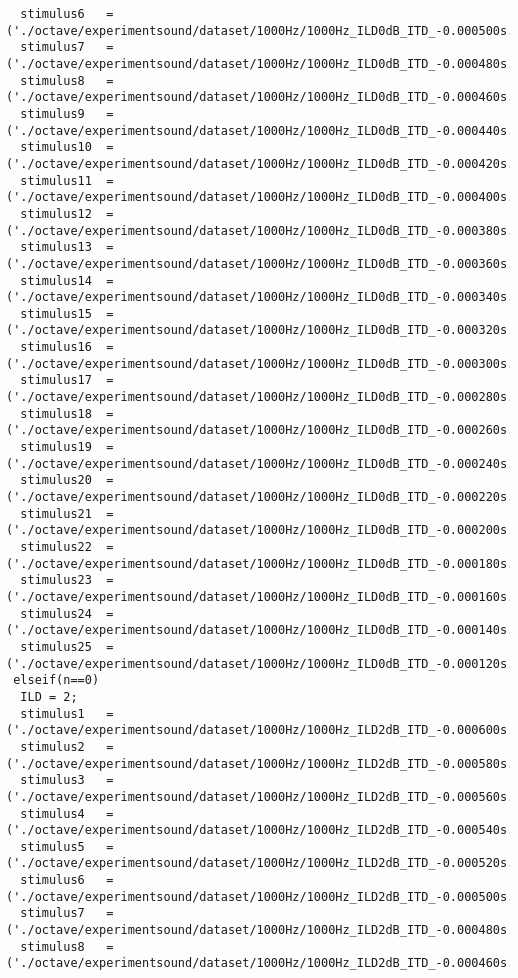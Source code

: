 {\begin{verbatim}
  stimulus6   =('./octave/experimentsound/dataset/1000Hz/1000Hz_ILD0dB_ITD_-0.000500s.wav');
  stimulus7   =('./octave/experimentsound/dataset/1000Hz/1000Hz_ILD0dB_ITD_-0.000480s.wav');
  stimulus8   =('./octave/experimentsound/dataset/1000Hz/1000Hz_ILD0dB_ITD_-0.000460s.wav');
  stimulus9   =('./octave/experimentsound/dataset/1000Hz/1000Hz_ILD0dB_ITD_-0.000440s.wav');
  stimulus10  =('./octave/experimentsound/dataset/1000Hz/1000Hz_ILD0dB_ITD_-0.000420s.wav');
  stimulus11  =('./octave/experimentsound/dataset/1000Hz/1000Hz_ILD0dB_ITD_-0.000400s.wav');
  stimulus12  =('./octave/experimentsound/dataset/1000Hz/1000Hz_ILD0dB_ITD_-0.000380s.wav');
  stimulus13  =('./octave/experimentsound/dataset/1000Hz/1000Hz_ILD0dB_ITD_-0.000360s.wav');
  stimulus14  =('./octave/experimentsound/dataset/1000Hz/1000Hz_ILD0dB_ITD_-0.000340s.wav');
  stimulus15  =('./octave/experimentsound/dataset/1000Hz/1000Hz_ILD0dB_ITD_-0.000320s.wav');
  stimulus16  =('./octave/experimentsound/dataset/1000Hz/1000Hz_ILD0dB_ITD_-0.000300s.wav');
  stimulus17  =('./octave/experimentsound/dataset/1000Hz/1000Hz_ILD0dB_ITD_-0.000280s.wav');
  stimulus18  =('./octave/experimentsound/dataset/1000Hz/1000Hz_ILD0dB_ITD_-0.000260s.wav');
  stimulus19  =('./octave/experimentsound/dataset/1000Hz/1000Hz_ILD0dB_ITD_-0.000240s.wav');
  stimulus20  =('./octave/experimentsound/dataset/1000Hz/1000Hz_ILD0dB_ITD_-0.000220s.wav');
  stimulus21  =('./octave/experimentsound/dataset/1000Hz/1000Hz_ILD0dB_ITD_-0.000200s.wav');
  stimulus22  =('./octave/experimentsound/dataset/1000Hz/1000Hz_ILD0dB_ITD_-0.000180s.wav');
  stimulus23  =('./octave/experimentsound/dataset/1000Hz/1000Hz_ILD0dB_ITD_-0.000160s.wav');
  stimulus24  =('./octave/experimentsound/dataset/1000Hz/1000Hz_ILD0dB_ITD_-0.000140s.wav');
  stimulus25  =('./octave/experimentsound/dataset/1000Hz/1000Hz_ILD0dB_ITD_-0.000120s.wav');
 elseif(n==0)
  ILD = 2;
  stimulus1   =('./octave/experimentsound/dataset/1000Hz/1000Hz_ILD2dB_ITD_-0.000600s.wav');
  stimulus2   =('./octave/experimentsound/dataset/1000Hz/1000Hz_ILD2dB_ITD_-0.000580s.wav');
  stimulus3   =('./octave/experimentsound/dataset/1000Hz/1000Hz_ILD2dB_ITD_-0.000560s.wav');
  stimulus4   =('./octave/experimentsound/dataset/1000Hz/1000Hz_ILD2dB_ITD_-0.000540s.wav');
  stimulus5   =('./octave/experimentsound/dataset/1000Hz/1000Hz_ILD2dB_ITD_-0.000520s.wav');
  stimulus6   =('./octave/experimentsound/dataset/1000Hz/1000Hz_ILD2dB_ITD_-0.000500s.wav');
  stimulus7   =('./octave/experimentsound/dataset/1000Hz/1000Hz_ILD2dB_ITD_-0.000480s.wav');
  stimulus8   =('./octave/experimentsound/dataset/1000Hz/1000Hz_ILD2dB_ITD_-0.000460s.wav');

\end{verbatim}}
